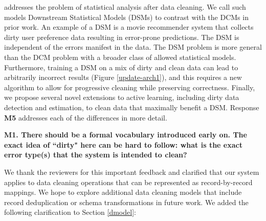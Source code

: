 
\sys addresses the problem of statistical analysis after data cleaning.
We call such models Downstream Statistical Models (DSMs) to contrast with the DCMs in prior work.
An example of a DSM is a movie recommender system that collects dirty user preference data resulting in error-prone predictions.
The DSM is independent of the errors manifest in the data.
The DSM problem is more general than the DCM problem with a broader class of allowed statistical models.
Furthermore, training a DSM on a mix of dirty and clean data can lead to arbitrarily incorrect results (Figure \ref{update-arch1}), and this requires a new algorithm to allow for progressive cleaning while preserving correctness.
Finally, we propose several novel extensions to active learning, including dirty data detection and estimation, to clean data that maximally benefit a DSM.
Response \textbf{M5} addresses each of the differences in more detail.


\vspace{0.5em}

\noindent\noindent \textbf{M1. There should be a formal vocabulary introduced early on. The exact idea of ``dirty" here can be hard to follow: what is the exact error type(s) that the system is intended to clean?}

\vspace{0.5em}

We thank the reviewers for this important feedback and clarified that our system applies to data cleaning operations that can be represented as record-by-record mappings.
We hope to explore additional data cleaning models that include record deduplication or schema transformations in future work.
We added the following clarification to Section \ref{dmodel}:

